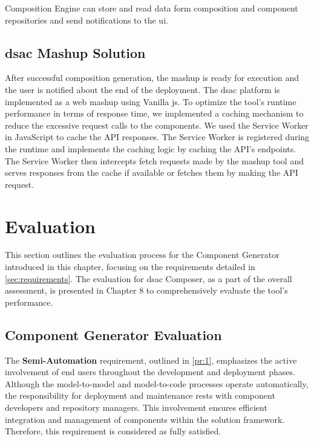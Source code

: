 Composition Engine can store and read data form composition and
component repositories and send notifications to the \gls{ui}.


\vspace{-10pt}
\hypertarget{sec:dsac-mashup-solution}{%
\subsection{\gls{dsac} Mashup Solution}\label{sec:dsac-mashup-solution}}
\vspace{10pt}

After successful composition generation, the mashup is ready for execution and the user is notified about the end of the deployment. The \gls{dsac} platform is implemented as a web mashup using Vanilla \gls{js}. To optimize the tool’s runtime performance in terms of response time, we implemented a caching mechanism to reduce the excessive request calls to the components. We used the Service Worker in JavaScript to cache the API responses. The Service Worker is registered during the runtime and implements the caching logic by caching the API's endpoints. The Service Worker then intercepts fetch requests made by the mashup tool and serves responses from the cache if available or fetches them by making the API request.

\vspace{-15pt}
\hypertarget{sec:cp.evaluation}{%
\section{Evaluation}\label{sec:cp.evaluation}}
\vspace{15pt}

This section outlines the evaluation process for the Component Generator introduced in this chapter, focusing on the requirements detailed in \cref{sec:requirements}. The evaluation for \gls{dsac} Composer, as a part of the overall assessment, is presented in Chapter 8 to comprehensively evaluate the tool's performance.

\hypertarget{sec:cp.evaluation.cg}{%
\subsection{Component Generator Evaluation }\label{sec:cp.evaluation.cg}}
\vspace{10pt}

The \textbf{Semi-Automation} requirement, outlined in \cref{pr:1}, emphasizes the active involvement of end users throughout the development and deployment phases. Although the model-to-model and model-to-code processes operate automatically, the responsibility for deployment and maintenance rests with component developers and repository managers. This involvement ensures efficient integration and management of components within the solution framework. Therefore, this requirement is considered as fully satisfied.

